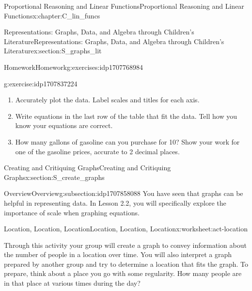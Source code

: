 \documentclass[oneside,10pt,]{book}
\numberwithin{equation}{chapter}
\newcommand{\hrulethin}  {\noalign{\hrule height 0.04em}}
\begin{document}
\begin{chapterptx}{Proportional Reasoning and Linear Functions}{}{Proportional Reasoning and Linear Functions}{}{}{x:chapter:C_lin_funcs}
\begin{sectionptx}{Representations: Graphs, Data, and Algebra through Children's Literature}{}{Representations: Graphs, Data, and Algebra through Children's Literature}{}{}{x:section:S_graphs_lit}
\begin{exercises-subsection}{Homework}{}{Homework}{}{}{g:exercises:idp1707768984}
\begin{divisionexercise}{5}{}{}{g:exercise:idp1707837224}
\begin{enumerate}[font=\bfseries,label=(\alph*),ref=\alph*]
\begin{tableptx}{\textbf{Table of Gas Prices}}{x:table:tbl-gas-prices}{}
{\begin{tabular}{Accc}
&&\tabularnewline\hrulethin
\end{tabular}
}%
\end{tableptx}%
\item{}Accurately plot the data. Label scales and titles for each axis.%
\item{}Write equations in the last row of the table that fit the data. Tell how you know your equations are correct.%
\item{}How many gallons of gasoline can you purchase for \textdollar{}10? Show your work for one of the gasoline prices, accurate to 2 decimal places.%
\end{enumerate}
\end{divisionexercise}%
\end{exercises-subsection}
\end{sectionptx}
%
%
\typeout{************************************************}
\typeout{************************************************}
%
\begin{sectionptx}{Creating and Critiquing Graphs}{}{Creating and Critiquing Graphs}{}{}{x:section:S_create_graphs}
%
%
\typeout{************************************************}
\typeout{************************************************}
%
\begin{subsectionptx}{Overview}{}{Overview}{}{}{g:subsection:idp1707858088}
You have seen that graphs can be helpful in representing data. In Lesson 2.2, you will specifically explore the importance of scale when graphing equations.%
\end{subsectionptx}
%
%
\typeout{************************************************}
\typeout{************************************************}
%
\begin{worksheet-subsection}{Location, Location, Location}{}{Location, Location, Location}{}{}{x:worksheet:act-location}
\begin{introduction}{}%
Through this activity your group will create a graph to convey information about the number of people in a location over time. You will also interpret a graph prepared by another group and try to determine a location that fits the graph. To prepare, think about a place you go with some regularity. How many people are in that place at various times during the day?%
\par

\end{introduction}
\end{worksheet-subsection}
\end{sectionptx}
\end{chapterptx}
\end{document}
